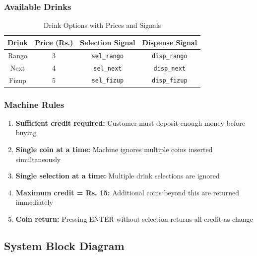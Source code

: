 \documentclass[12pt,a4paper]{article}
\begin{document}
\subsubsection{Available Drinks}
\begin{table}[H]
    \centering
    \begin{tabular}{|c|c|c|c|}
        \hline
        \textbf{Drink} & \textbf{Price (Rs.)} & \textbf{Selection Signal} & \textbf{Dispense Signal} \\
        \hline
        Rango & 3 & \texttt{sel\_rango} & \texttt{disp\_rango} \\
        Next & 4 & \texttt{sel\_next} & \texttt{disp\_next} \\
        Fizup & 5 & \texttt{sel\_fizup} & \texttt{disp\_fizup} \\
        \hline
    \end{tabular}
    \caption{Drink Options with Prices and Signals}
\end{table}

\subsubsection{Machine Rules}
\begin{enumerate}
    \item \textbf{Sufficient credit required:} Customer must deposit enough money before buying
    \item \textbf{Single coin at a time:} Machine ignores multiple coins inserted simultaneously
    \item \textbf{Single selection at a time:} Multiple drink selections are ignored
    \item \textbf{Maximum credit = Rs. 15:} Additional coins beyond this are returned immediately
    \item \textbf{Coin return:} Pressing ENTER without selection returns all credit as change
\end{enumerate}

\subsection{System Block Diagram}
\end{document}
